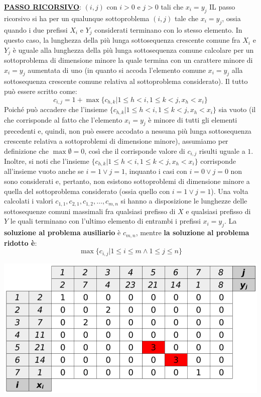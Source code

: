 \documentclass[12pt]{article}
\begin{document}
\textbf{\underline{PASSO RICORSIVO}}: $(i,j)$ con $i >0$ e $j>0$ tali che $x_i = y_j$ \newline
IL passo ricorsivo si ha per un qualunque sottoproblema $(i,j)$ tale che $x_i = y_j$, ossia quando i due prefissi $X_i$ e $Y_j$ considerati terminano
con lo stesso elemento. In questo caso, la lunghezza della più lunga sottosequenza crescente comune fra $X_i$ e $Y_j$ è uguale alla lunghezza della più lunga sottosequenza
comune calcolare per un sottoproblema di dimensione minore la quale termina con un carattere minore di $x_i = y_j$ aumentata di uno (in quanto si accoda l'elemento comune $x_i = y_j$ alla sottosequenza crescente comune relativa al sottoproblema considerato).
Il tutto può essere scritto come:
$$c_{i,j} = 1 + \max\{c_{h,k}|1 \leq h < i, 1 \leq k < j, x_h < x_i\}$$
Poiché può accadere che l'insieme $\{c_{h,k}|1 \leq h < i, 1 \leq k < j, x_h < x_i\}$ sia vuoto (il che corrisponde al fatto che l'elemento $x_i = y_j$ è minore di tutti gli elementi precedenti e, quindi, non può essere accodato a nessuna più lunga sottosequenza crescente relativa a sottoproblemi di dimensione minore),
assumiamo per definizione che $\max \emptyset = 0$, così che il corrisponde valore di $c_{i,j}$ risulti uguale a $1$. Inoltre, si noti che l'insieme $\{c_{h,k}|1 \leq h < i, 1 \leq k < j, x_h < x_i\}$ corrisponde all'insieme vuoto
anche se $i = 1 \vee j = 1$, inquanto i casi con $i = 0 \vee j = 0$ non sono considerati e, pertanto, non esistono sottoproblemi di dimensione minore a quella del sottoproblema considerato (ossia quello con $i = 1 \vee j = 1$). \newline
Una volta calcolati i valori $c_{1,1}, c_{2,1}, c_{1,2}, \dots, c_{m,n}$ si hanno a disposizione le lunghezze delle sottosequenze comuni massimali fra
qualsiasi prefisso di $X$ e qualsiasi prefisso di $Y$ le quali terminano con l'ultimo elemento di entrambi i prefissi $x_i = y_j$. La \textbf{soluzione al problema ausiliario} è $c_{m,n}$, mentre \textbf{la soluzione al problema ridotto è}:
$$\max\{c_{i,j}|1 \leq i \leq m \land 1 \leq j \leq n\}$$
\begin{center}
    \includegraphics[width = 0.60\linewidth]{Images/9.png}
\end{center}
\end{document}

